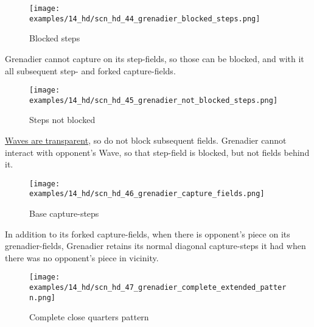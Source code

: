 \vspace*{-0.7\baselineskip}
\noindent
\begin{wrapfigure}[4]{l}{0.41\textwidth}
\centering
\texttt{[image: examples/14\_hd/scn\_hd\_44\_grenadier\_blocked\_steps.png]}
\vspace*{-0.5\baselineskip}
\caption{Blocked steps}
\label{fig:scn_hd_44_grenadier_blocked_steps}
\end{wrapfigure}
Grenadier cannot capture on its step-fields, so those can be blocked, and with it
all subsequent step- and forked capture-fields.

\vspace*{3.3\baselineskip}
\noindent
\begin{wrapfigure}[5]{l}{0.41\textwidth}
\centering
\texttt{[image: examples/14\_hd/scn\_hd\_45\_grenadier\_not\_blocked\_steps.png]}
\vspace*{-0.5\baselineskip}
\caption{Steps not blocked}
\label{fig:scn_hd_45_grenadier_not_blocked_steps}
\end{wrapfigure}
\hyperref[fig:scn_mv_07_wave_is_transparent]{Waves are transparent}, so do not block
subsequent fields. Grenadier cannot interact with opponent's Wave, so that step-field
is blocked, but not fields behind it.

\clearpage %

\vspace*{-2.3\baselineskip}
\noindent
\begin{wrapfigure}[7]{l}{0.4\textwidth}
\centering
\texttt{[image: examples/14\_hd/scn\_hd\_46\_grenadier\_capture\_fields.png]}
\vspace*{-0.5\baselineskip}
\caption{Base capture-steps}
\label{fig:scn_hd_46_grenadier_capture_fields}
\end{wrapfigure}
In addition to its forked capture-fields, when there is opponent's piece on its
grenadier-fields, Grenadier retains its normal diagonal capture-steps it had when
there was no opponent's piece in vicinity.

\vspace*{0.3\baselineskip}
\noindent
\begin{figure}[!h]
\texttt{[image: examples/14\_hd/scn\_hd\_47\_grenadier\_complete\_extended\_pattern.png]}
\vspace*{-1.3\baselineskip}
\caption{Complete close quarters pattern}
\label{fig:scn_hd_47_grenadier_complete_extended_pattern}
\end{figure}


